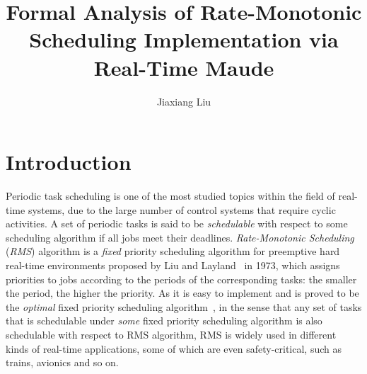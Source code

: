 \documentclass{llncs}
\begin{document}

\title{Formal Analysis of Rate-Monotonic Scheduling Implementation via Real-Time Maude}
\author{Jiaxiang Liu}
\maketitle
\thispagestyle{empty}

\section{Introduction}
Periodic task scheduling is one of the most studied topics within the
field of real-time systems, due to the large number of control systems
that require cyclic activities. A set of periodic tasks is said to be
\emph{schedulable} with respect to some scheduling algorithm if all
jobs meet their deadlines. \emph{Rate-Monotonic Scheduling}
(\emph{RMS}) algorithm is a \emph{fixed} priority scheduling algorithm
for preemptive hard real-time environments proposed by Liu and
Layland~\cite{DBLP:journals/jacm/LiuL73} in 1973, which assigns
priorities to jobs according to the periods of the corresponding
tasks: the smaller the period, the higher the priority. As it is easy
to implement and is proved to be the \emph{optimal} fixed priority
scheduling algorithm~\cite{DBLP:journals/jacm/LiuL73}, in the sense
that any set of tasks that is schedulable under \emph{some} fixed
priority scheduling algorithm is also schedulable with respect to RMS
algorithm, RMS is widely used in different kinds of real-time
applications, some of which are even safety-critical, such as trains,
avionics and so on. 
\end{document}
